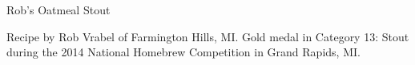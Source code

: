 \begin{recipe}{Rob's Oatmeal Stout} %

\begin{aboutblock}
Recipe by Rob Vrabel of Farmington Hills, MI. Gold medal in Category 13: Stout
during the 2014 National Homebrew Competition in Grand Rapids, MI. \sourceaha
\end{aboutblock}


\begin{methodandtiming}

\begin{mashsteps}
\end{mashsteps}

\begin{fermentationsteps}
\end{fermentationsteps}

\end{methodandtiming}

\recipebreak

\begin{ingredientsblock}

\begin{malts}
\end{malts}

\begin{hops}
\end{hops}


\end{ingredientsblock}

\end{recipe}

